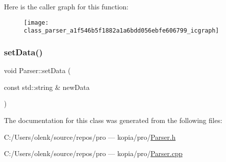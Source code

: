 Here is the caller graph for this function\+:
\nopagebreak
\begin{figure}[H]
\begin{center}
\leavevmode
\texttt{[image: class\_parser\_a1f546b5f1882a1a6bdd056ebfe606799\_icgraph]}
\end{center}
\end{figure}
\mbox{\label{class_parser_a31ff3ae9be8e40870564ff18e50cd69f}} 
\subsubsection{\texorpdfstring{setData()}{setData()}}
{\footnotesize\ttfamily void Parser\+::set\+Data (\begin{DoxyParamCaption}\item[{const std\+::string \&}]{new\+Data }\end{DoxyParamCaption})}



The documentation for this class was generated from the following files\+:\begin{DoxyCompactItemize}
\item 
C\+:/\+Users/olenk/source/repos/pro — kopia/pro/\mbox{\hyperlink{_parser_8h}{Parser.\+h}}\item 
C\+:/\+Users/olenk/source/repos/pro — kopia/pro/\mbox{\hyperlink{_parser_8cpp}{Parser.\+cpp}}\end{DoxyCompactItemize}
